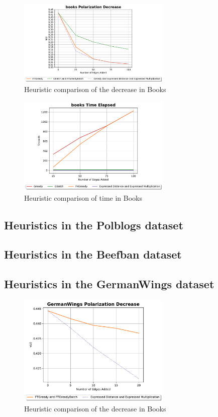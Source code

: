 \begin{figure}[!htbp]
	\centering
	\includegraphics[width=0.65\textwidth]{Figures/books Polarization Decrease}
	\caption{Heuristic comparison of the decrease in Books}
	\label{fig:books_pol}
\end{figure}


\begin{figure}[!htbp]
	\centering
	\includegraphics[width=0.65\textwidth]{Figures/books Time Elapsed}
	\caption{Heuristic comparison of time in Books}
	\label{fig:books_time}
\end{figure}

\subsection{Heuristics in the Polblogs dataset}
\subsection{Heuristics in the Beefban dataset}

\subsection{Heuristics in the GermanWings dataset}

\begin{figure}[H]
	\centering
	\includegraphics[width=0.65\textwidth]{Figures/GermanWings Polarization Decrease}
	\caption{Heuristic comparison of the decrease in Books}
	\label{fig:germanwings_pol}
\end{figure}


